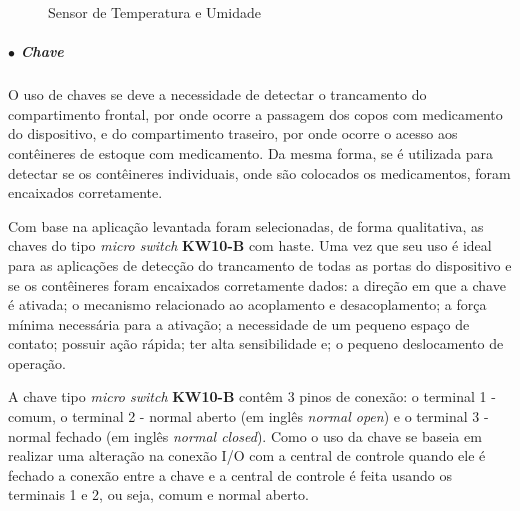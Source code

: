     \begin{figure}[H]
        \centering
        \hspace{0.1\textwidth}
        \caption{Sensor de Temperatura e Umidade}\label{fig:sensor_temp_umidade}
    \end{figure}
    
    
    
    \subparagraph*{$\bullet$ Chave} \hfill
    
    O uso de chaves se deve a necessidade de detectar o trancamento do compartimento frontal, por onde ocorre a passagem dos copos com medicamento do dispositivo, e do compartimento traseiro, por onde ocorre o acesso aos contêineres de estoque com medicamento. Da mesma forma, se é utilizada para detectar se os contêineres individuais, onde são colocados os medicamentos, foram encaixados corretamente.
    
    Com base na aplicação levantada foram selecionadas, de forma qualitativa, as chaves do tipo \textit{micro switch} \textbf{KW10-B} com haste. Uma vez que seu uso é ideal para as aplicações de detecção do trancamento de todas as portas do dispositivo e se os contêineres foram encaixados corretamente dados: a direção em que a chave é ativada; o mecanismo relacionado ao acoplamento e desacoplamento; a força mínima necessária para a ativação; a necessidade de um pequeno espaço de contato; possuir ação rápida; ter alta sensibilidade e; o pequeno deslocamento de operação.
    
    A chave tipo \textit{micro switch} \textbf{KW10-B} contêm 3 pinos de conexão: o terminal 1 - comum, o terminal 2 - normal aberto (em inglês \textit{normal open}) e o terminal 3 - normal fechado (em inglês \textit{normal closed}). Como o uso da chave se baseia em realizar uma alteração na conexão I/O com a central de controle quando ele é fechado a conexão entre a chave e a central de controle é feita usando os terminais 1 e 2, ou seja, comum e normal aberto. 
    
